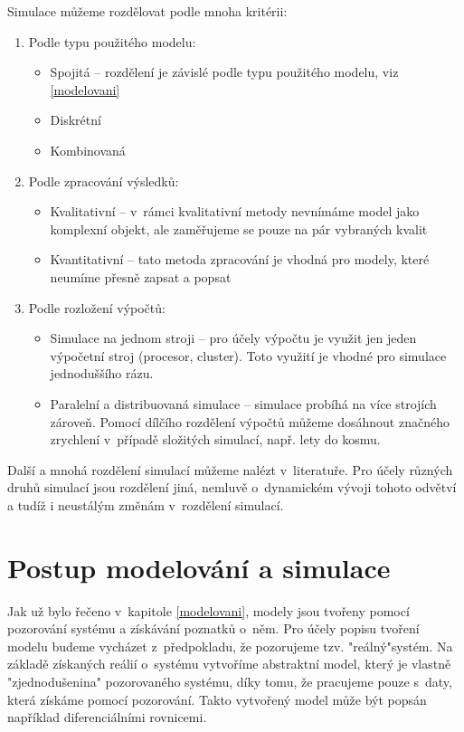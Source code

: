 Simulace můžeme rozdělovat podle mnoha kritérii:
\begin{enumerate}
    \item Podle typu použitého modelu:
        \begin{itemize}
            \item Spojitá -- rozdělení je závislé podle typu použitého modelu, viz \ref{modelovani}
            \item Diskrétní
            \item Kombinovaná
        \end{itemize}
    \item Podle zpracování výsledků:
        \begin{itemize}
            \item Kvalitativní -- v~rámci kvalitativní metody nevnímáme model jako komplexní objekt, ale zaměřujeme se pouze na pár vybraných kvalit
            \item Kvantitativní -- tato metoda zpracování je vhodná pro modely, které neumíme přesně zapsat a popsat
        \end{itemize}
    \item Podle rozložení výpočtů:
        \begin{itemize}
            \item Simulace na jednom stroji -- pro účely výpočtu je využit jen jeden výpočetní stroj (procesor, cluster). Toto využití je vhodné pro simulace jednoduššího rázu.
            \item Paralelní a distribuovaná simulace -- simulace probíhá na více strojích zároveň. Pomocí dílčího rozdělení výpočtů můžeme dosáhnout značného zrychlení v~případě složitých simulací, např. lety do kosmu.
        \end{itemize}
\end{enumerate}
Další a mnohá rozdělení simulací můžeme nalézt v~literatuře. Pro účely různých druhů simulací jsou rozdělení jiná, nemluvě o~dynamickém vývoji tohoto odvětví a tudíž i neustálým změnám v~rozdělení simulací.

\section{Postup modelování a simulace}
Jak už bylo řečeno v~kapitole \ref{modelovani}, modely jsou tvořeny pomocí pozorování systému a získávání poznatků o~něm. Pro účely popisu tvoření modelu budeme vycházet z~předpokladu, že pozorujeme tzv. "reálný"\space systém. Na základě získaných reálií o~systému vytvoříme abstraktní model, který je vlastně "zjednodušenina" pozorovaného systému, díky tomu, že pracujeme pouze s~daty, která získáme pomocí pozorování. Takto vytvořený model může být popsán například diferenciálními rovnicemi.

